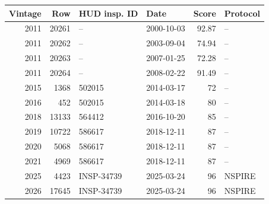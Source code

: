 \begin{tabular}{rrllrl}
\toprule
Vintage & Row & HUD insp. ID & Date & Score & Protocol \\
\midrule
2011 & 20261 & -- & 2000-10-03 & 92.87 & -- \\
2011 & 20262 & -- & 2003-09-04 & 74.94 & -- \\
2011 & 20263 & -- & 2007-01-25 & 72.28 & -- \\
2011 & 20264 & -- & 2008-02-22 & 91.49 & -- \\
2015 & 1368 & 502015 & 2014-03-17 & 72 & -- \\
2016 & 452 & 502015 & 2014-03-18 & 80 & -- \\
2018 & 13133 & 564412 & 2016-10-20 & 85 & -- \\
2019 & 10722 & 586617 & 2018-12-11 & 87 & -- \\
2020 & 5068 & 586617 & 2018-12-11 & 87 & -- \\
2021 & 4969 & 586617 & 2018-12-11 & 87 & -- \\
2025 & 4423 & INSP-34739 & 2025-03-24 & 96 & NSPIRE \\
2026 & 17645 & INSP-34739 & 2025-03-24 & 96 & NSPIRE \\
\bottomrule
\end{tabular}
